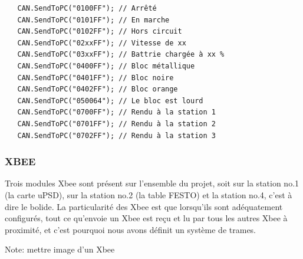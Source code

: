 \documentclass[10pt,a4paper,final]{article}
\begin{document}
\begin{lstlisting}
   CAN.SendToPC("0100FF"); // Arrêté
   CAN.SendToPC("0101FF"); // En marche
   CAN.SendToPC("0102FF"); // Hors circuit
   CAN.SendToPC("02xxFF"); // Vitesse de xx
   CAN.SendToPC("03xxFF"); // Battrie chargée à xx %
   CAN.SendToPC("0400FF"); // Bloc métallique
   CAN.SendToPC("0401FF"); // Bloc noire
   CAN.SendToPC("0402FF"); // Bloc orange
   CAN.SendToPC("050064"); // Le bloc est lourd
   CAN.SendToPC("0700FF"); // Rendu à la station 1
   CAN.SendToPC("0701FF"); // Rendu à la station 2
   CAN.SendToPC("0702FF"); // Rendu à la station 3
\end{lstlisting}
\begin{spacing}{1.5}
\pagebreak

\subsubsection{XBEE}
Trois modules Xbee sont présent sur l'ensemble du projet, soit sur la station no.1 (la carte uPSD), sur la station no.2 (la table FESTO) et la station no.4, c'est à dire le bolide. La particularité des Xbee est que lorsqu'ils sont adéquatement configurés, tout ce qu'envoie un Xbee est reçu et lu par tous les autres Xbee à proximité, et c'est pourquoi nous avons définit un système de trames.

Note: mettre image d'un Xbee


\end{spacing}
\end{document}
